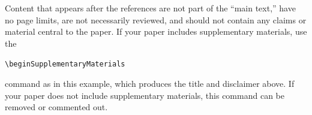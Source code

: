 \documentclass[10pt]{article} %
\theoremstyle{plain}
\theoremstyle{definition}
\theoremstyle{remark}
\begin{document}




\beginSupplementaryMaterials

Content that appears after the references are not part of the ``main text,'' have no page limits, are not necessarily reviewed, and should not contain any claims or material central to the paper. 
%
If your paper includes supplementary materials, use the \begin{center}
    {\tt {\textbackslash}beginSupplementaryMaterials} 
\end{center}
command as in this example, which produces the title and disclaimer above. 
%
If your paper does not include supplementary materials, this command can be removed or commented out.
\end{document}
